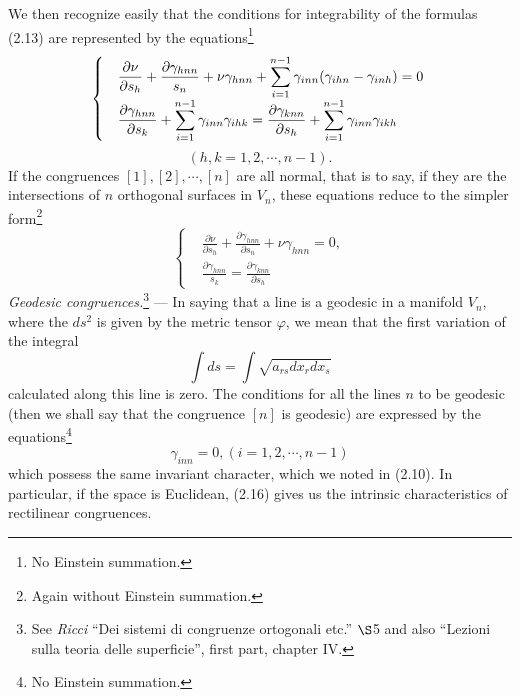 \documentclass{book}
\begin{document}
We then recognize easily that the conditions for integrability of the formulas (2.13) are represented by the equations\footnote{No Einstein summation.}
\begin{equation}
\begin{cases}
	&\displaystyle\frac{\partial\nu}{\partial s_h}+\frac{\partial\gamma_{hnn}}{s_n}+\nu\gamma_{hnn}+\sum_{i=1}^{n-1}\gamma_{inn}(\gamma_{ihn}-\gamma_{inh})=0\text{}\\
	&\displaystyle\frac{\partial\gamma_{hnn}}{\partial s_k}+\sum_{i=1}^{n-1}\gamma_{inn}\gamma_{ihk}=\frac{\partial\gamma_{knn}}{\partial s_h}+\sum_{i=1}^{n-1}\gamma_{inn}\gamma_{ikh}\text{}
\end{cases}\\
\end{equation}
$$(h,k=1,2,\cdots,n-1).$$
If the congruences $[1],[2],\cdots,[n]$ are all normal, that is to say, if they are the intersections of $n$ orthogonal surfaces in $V_n$, these equations reduce to the simpler form\footnote{Again without Einstein summation.}
\begin{equation*}
\tag{2.16'}
\begin{cases}
	&\displaystyle\frac{\partial\nu}{\partial s_h}+\frac{\partial\gamma_{hnn}}{\partial s_n}+\nu\gamma_{hnn}=0,\\
	&\displaystyle\frac{\partial\gamma_{hnn}}{s_k}=\frac{\partial\gamma_{knn}}{\partial s_h}
\end{cases}
\end{equation*}
\emph{Geodesic congruences.}\footnote{See \emph{Ricci} ``Dei sistemi di congruenze ortogonali etc.'' $\S$5 and also ``Lezioni sulla teoria delle superficie'', first part, chapter IV.} --- In saying that a line is a geodesic in a manifold $V_n$, where the $ds^2$ is given by the metric tensor $\varphi$, we mean that the first variation of the integral
$$\int ds=\int\sqrt{a_{rs}dx_rdx_s}$$ 
calculated along this line is zero. The conditions for all the lines $n$ to be geodesic (then we shall say that the congruence $[n]$ is geodesic) are expressed by the equations\footnote{No Einstein summation.}
\begin{equation}
\gamma_{inn}=0, (i=1,2,\cdots,n-1)
\end{equation}
which possess the same invariant character, which we noted in (2.10). In particular, if the space is Euclidean, (2.16) gives us the intrinsic characteristics of rectilinear congruences. 
\end{document}
